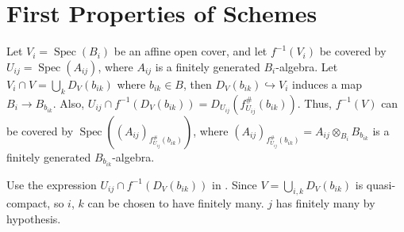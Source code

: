 \section{First Properties of Schemes}

\begin{exercise}\label{ex3.1}
	Let $V_i=\operatorname{Spec}\!\left(B_i\right)$ be an affine open cover, and let $f^{-1}\!\left(V_i\right)$ be covered by $U_{ij}=\operatorname{Spec}\!\left(A_{ij}\right)$, where $A_{ij}$ is a finitely generated $B_i$-algebra. Let $V_i\cap V=\bigcup_kD_V\!\left(b_{ik}\right)$ where $b_{ik}\in B$, then $D_V\!\left(b_{ik}\right)\hookrightarrow V_i$ induces a map $B_i\rightarrow B_{b_{ik}}$. Also, $U_{ij}\cap f^{-1}\!\left(D_V\!\left(b_{ik}\right)\right)=D_{U_{ij}}\!\left(f_{U_{ij}}^\#\left(b_{ik}\right)\right)$. Thus, $f^{-1}(V)$ can be covered by $\operatorname{Spec}\!\left(\left(A_{ij}\right)_{f_{U_{ij}}^\#\!\left(b_{ik}\right)}\right)$, where $\left(A_{ij}\right)_{f_{U_{ij}}^\#\!\left(b_{ik}\right)}=A_{ij}\otimes_{B_i}B_{b_{ik}}$ is a finitely generated $B_{b_{ik}}$-algebra.
\end{exercise}

\begin{exercise}\label{ex3.2}
	Use the expression $U_{ij}\cap f^{-1}\!\left(D_V\!\left(b_{ik}\right)\right)$ in . Since $V=\bigcup_{i,k}D_V\!\left(b_{ik}\right)$ is quasi-compact, so $i$, $k$ can be chosen to have finitely many. $j$ has finitely many by hypothesis.
\end{exercise}

